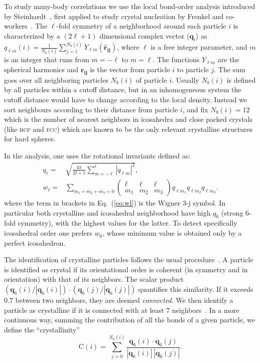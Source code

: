 \documentclass[twocolumn,superscriptaddress]{revtex4}
\begin{document}
To study many-body correlations we use the local bond-order analysis introduced by
Steinhardt~\cite{steinhardt}, first applied to study crystal nucleation by
Frenkel and co-workers~\cite{auer}. 
The $\ell$-fold symmetry of a neighborhood around each particle $i$ is characterized by a $(2\ell+1)$ dimensional complex vector ($\mathbf{q}_l$) as $q_{\ell m}(i)=\frac{1}{N_b(i)}\sum_{j=1}^{N_b(i)} Y_{\ell m}(\mathbf{\hat{r}_{ij}})$, where
$\ell$ is a free integer parameter, and $m$ is an integer
that runs from $m=-\ell$ to $m=\ell$. The functions $Y_{\ell m}$ are the spherical harmonics
and $\mathbf{\hat{r}_{ij}}$ is the vector from particle $i$ to particle $j$.
The sum goes over all neighboring particles $N_b(i)$ of particle $i$. Usually 
$N_b(i)$ is defined by all particles within a cutoff distance, but in an inhomogeneous system
the cutoff distance would have to change according to the local density. Instead we
sort neighbours according to their distance from particle $i$, and
fix $N_b(i)=12$ which is the number of nearest neighbors in icosahedra and close packed crystals (like \textsc{hcp} and \textsc{fcc})
which are known to be the only relevant crystalline structures for hard spheres.

In the analysis, one uses the rotational invariants defined as:
\begin{align}
	q_\ell =& \sqrt{\frac{4\pi}{2l+1} \sum_{m=-\ell}^{\ell} |q_{\ell m}|^2 }, \label{eq:ql}\\
	w_\ell =& \sum_{m_1+m_2+m_3=0} 
			\left( \begin{array}{ccc}
				\ell & \ell & \ell \\
				m_1 & m_2 & m_3 
			\end{array} \right)
			q_{\ell m_1} q_{\ell m_2} q_{\ell m_3}. \label{eq:wl}
\end{align}
where the term in brackets in Eq.~(\ref{eq:wl}) is the Wigner 3-j symbol.
In particular both crystalline and icosahedral neighborhood have high $q_6$ (strong 6-fold symmetry), with the highest values for the latter. To detect specifically icosahedral order one prefers $w_6$, whose minimum value is obtained only by a perfect icosahedron.

The identification of crystalline particles follows the usual procedure~\cite{auer}. A particle is identified as crystal if
its orientational order is coherent (in symmetry and in orientation) with that of its neighbors.
The scalar product $(\mathbf{q}_6(i)/|\mathbf{q}_6(i)|)\cdot(\mathbf{q}_6(j)/|\mathbf{q}_6(j)|)$ quantifies this similarity. If it exceeds $0.7$ between
two neighbors, they are deemed \emph{connected}. We then identify a particle as crystalline if it is connected with at least $7$ neighbors~\cite{auer}. In a more continuous way, summing the contribution of all the bonds of a given particle, we define the ``crystallinity''~\cite{russo_hs}
\begin{equation}\label{eqn:crystallinity}
 \text{C}(i)=\sum_{j=0}^{N_b(i)}\frac{\mathbf{q}_6(i)\cdot\mathbf{q}_6(j)}{|\mathbf{q}_6(i)|\,|\mathbf{q}_6(j)|}.
\end{equation}
\end{document}

